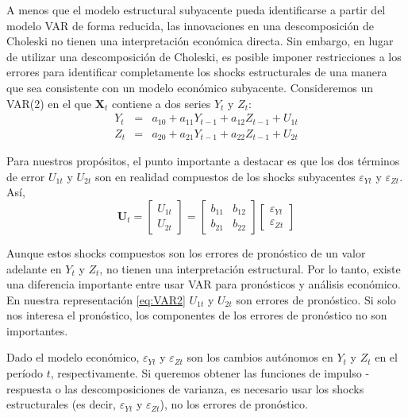 \documentclass[
]{book}
\begin{document}
A menos que el modelo estructural subyacente pueda identificarse a partir del modelo VAR de forma reducida, las innovaciones en una descomposición de Choleski no tienen una interpretación económica directa. Sin embargo, en lugar de utilizar una descomposición de Choleski, es posible imponer restricciones a los errores para identificar completamente los shocks estructurales de una manera que sea consistente con un modelo económico subyacente. Consideremos un VAR(2) en el que \(\mathbf{X}_t\) contiene a dos series \(Y_t\) y \(Z_t\):
\begin{eqnarray}
    Y_t & = & a_{10} + a_{11} Y_{t - 1} + a_{12} Z_{t-1} + U_{1t} \nonumber \\
    Z_t & = & a_{20} + a_{21} Y_{t - 1} + a_{22} Z_{t-1} + U_{2t} 
    \label{eq:VAR2}
\end{eqnarray}

Para nuestros propósitos, el punto importante a destacar es que los dos términos de error \(U_{1t}\) y \(U_{2t}\) son en realidad compuestos de los shocks subyacentes \(\varepsilon_{Yt}\) y \(\varepsilon_{Zt}\). Así,
\begin{equation*}
    \mathbf{U}_t = 
    \begin{bmatrix}
    U_{1t} \\ U_{2t}
    \end{bmatrix} = 
    \begin{bmatrix}
    b_{11} & b_{12} \\ b_{21} & b_{22}
    \end{bmatrix}
    \begin{bmatrix}
    \varepsilon_{Yt} \\ \varepsilon_{Zt}
    \end{bmatrix}
\end{equation*}

Aunque estos shocks compuestos son los errores de pronóstico de un valor adelante en \(Y_t\) y \(Z_t\), no tienen una interpretación estructural. Por lo tanto, existe una diferencia importante entre usar VAR para pronósticos y análisis económico. En nuestra representación \eqref{eq:VAR2} \(U_{1t}\) y \(U_{2t}\) son errores de pronóstico. Si solo nos interesa el pronóstico, los componentes de los errores de pronóstico no son importantes.

Dado el modelo económico, \(\varepsilon_{Yt}\) y \(\varepsilon_{Zt}\) son los cambios autónomos en \(Y_t\) y \(Z_t\) en el período \(t\), respectivamente. Si queremos obtener las funciones de impulso - respuesta o las descomposiciones de varianza, es necesario usar los shocks estructurales (es decir, \(\varepsilon_{Yt}\) y \(\varepsilon_{Zt}\)), no los errores de pronóstico.
\end{document}
